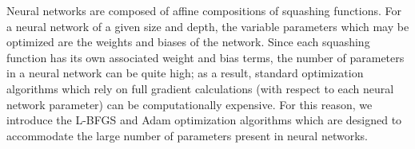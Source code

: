 Neural networks are composed of affine compositions of squashing functions. For a neural network of a given size and 
depth, the variable parameters which may be optimized are the weights and biases of the network. Since each squashing 
function has its own associated weight and bias terms, the number of parameters in a neural network can be quite high; 
as a result, standard optimization algorithms which rely on full gradient calculations (with respect to each neural 
network parameter) can be computationally expensive. For this reason, we introduce the L-BFGS\cite{Liu1989-sf} and Adam
\cite{kingma_adam_2014} optimization algorithms which are designed to accommodate the large number of parameters present
in neural networks.